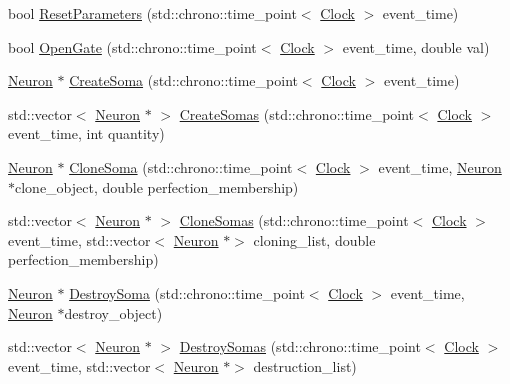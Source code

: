 \begin{DoxyCompactItemize}
\item 
bool \mbox{\hyperlink{classNeuron_a4c154fecb0b689d7da9d8d274f067ccf}{Reset\+Parameters}} (std\+::chrono\+::time\+\_\+point$<$ \mbox{\hyperlink{universe_8h_a0ef8d951d1ca5ab3cfaf7ab4c7a6fd80}{Clock}} $>$ event\+\_\+time)
\item 
bool \mbox{\hyperlink{classNeuron_a82d0a4739244d79ff929be01eeb0be28}{Open\+Gate}} (std\+::chrono\+::time\+\_\+point$<$ \mbox{\hyperlink{universe_8h_a0ef8d951d1ca5ab3cfaf7ab4c7a6fd80}{Clock}} $>$ event\+\_\+time, double val)
\item 
\mbox{\hyperlink{classNeuron}{Neuron}} $\ast$ \mbox{\hyperlink{classNeuron_a32593a869b25c778c1856c36704f49cf}{Create\+Soma}} (std\+::chrono\+::time\+\_\+point$<$ \mbox{\hyperlink{universe_8h_a0ef8d951d1ca5ab3cfaf7ab4c7a6fd80}{Clock}} $>$ event\+\_\+time)
\item 
std\+::vector$<$ \mbox{\hyperlink{classNeuron}{Neuron}} $\ast$ $>$ \mbox{\hyperlink{classNeuron_a2016d83b02bfe9e5548d5c24ef31dded}{Create\+Somas}} (std\+::chrono\+::time\+\_\+point$<$ \mbox{\hyperlink{universe_8h_a0ef8d951d1ca5ab3cfaf7ab4c7a6fd80}{Clock}} $>$ event\+\_\+time, int quantity)
\item 
\mbox{\hyperlink{classNeuron}{Neuron}} $\ast$ \mbox{\hyperlink{classNeuron_a7706e0f722c70138458423c07b6b153b}{Clone\+Soma}} (std\+::chrono\+::time\+\_\+point$<$ \mbox{\hyperlink{universe_8h_a0ef8d951d1ca5ab3cfaf7ab4c7a6fd80}{Clock}} $>$ event\+\_\+time, \mbox{\hyperlink{classNeuron}{Neuron}} $\ast$clone\+\_\+object, double perfection\+\_\+membership)
\item 
std\+::vector$<$ \mbox{\hyperlink{classNeuron}{Neuron}} $\ast$ $>$ \mbox{\hyperlink{classNeuron_a508841fa635a6e89609c514a79ea59da}{Clone\+Somas}} (std\+::chrono\+::time\+\_\+point$<$ \mbox{\hyperlink{universe_8h_a0ef8d951d1ca5ab3cfaf7ab4c7a6fd80}{Clock}} $>$ event\+\_\+time, std\+::vector$<$ \mbox{\hyperlink{classNeuron}{Neuron}} $\ast$$>$ cloning\+\_\+list, double perfection\+\_\+membership)
\item 
\mbox{\hyperlink{classNeuron}{Neuron}} $\ast$ \mbox{\hyperlink{classNeuron_a6ff7510f73e29c31003b016bdcb4a70e}{Destroy\+Soma}} (std\+::chrono\+::time\+\_\+point$<$ \mbox{\hyperlink{universe_8h_a0ef8d951d1ca5ab3cfaf7ab4c7a6fd80}{Clock}} $>$ event\+\_\+time, \mbox{\hyperlink{classNeuron}{Neuron}} $\ast$destroy\+\_\+object)
\item 
std\+::vector$<$ \mbox{\hyperlink{classNeuron}{Neuron}} $\ast$ $>$ \mbox{\hyperlink{classNeuron_a32b3a98eec58dc66481a2b877a7592cb}{Destroy\+Somas}} (std\+::chrono\+::time\+\_\+point$<$ \mbox{\hyperlink{universe_8h_a0ef8d951d1ca5ab3cfaf7ab4c7a6fd80}{Clock}} $>$ event\+\_\+time, std\+::vector$<$ \mbox{\hyperlink{classNeuron}{Neuron}} $\ast$$>$ destruction\+\_\+list)

\end{DoxyCompactItemize}
